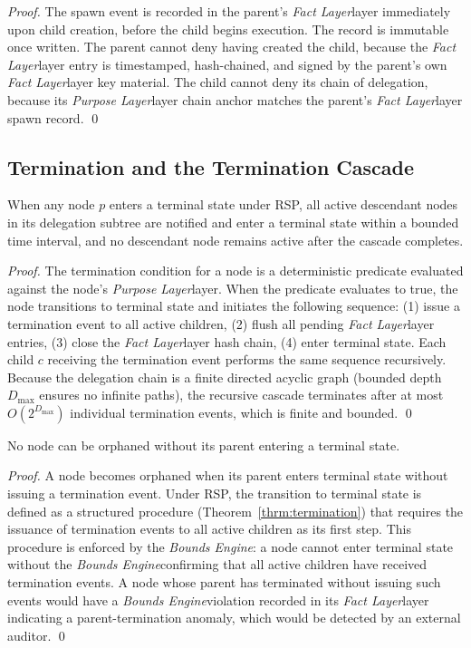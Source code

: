 \documentclass[12pt]{article}
\def\purpose{\textit{Purpose Layer}}
\def\bounds{\textit{Bounds Engine}}
\def\fact{\textit{Fact Layer}}
\begin{document}
\begin{proof}
The spawn event is recorded in the parent's \fact layer immediately upon child creation, before the child begins execution. The record is immutable once written. The parent cannot deny having created the child, because the \fact layer entry is timestamped, hash-chained, and signed by the parent's own \fact layer key material. The child cannot deny its chain of delegation, because its \purpose layer chain anchor matches the parent's \fact layer spawn record. \qed
\end{proof}

\subsection{Termination and the Termination Cascade}

\begin{thrm}[Termination]
\label{thrm:termination}
When any node $p$ enters a terminal state under RSP, all active descendant nodes in its delegation subtree are notified and enter a terminal state within a bounded time interval, and no descendant node remains active after the cascade completes.
\end{thrm}

\begin{proof}
The termination condition for a node is a deterministic predicate evaluated against the node's \purpose layer. When the predicate evaluates to true, the node transitions to terminal state and initiates the following sequence: (1) issue a termination event to all active children, (2) flush all pending \fact layer entries, (3) close the \fact layer hash chain, (4) enter terminal state. Each child $c$ receiving the termination event performs the same sequence recursively. Because the delegation chain is a finite directed acyclic graph (bounded depth $D_{\max}$ ensures no infinite paths), the recursive cascade terminates after at most $O(2^{D_{\max}})$ individual termination events, which is finite and bounded. \qed
\end{proof}

\begin{lemm}
\label{lemm:orphan-safety}
No node can be orphaned without its parent entering a terminal state.
\end{lemm}

\begin{proof}
A node becomes orphaned when its parent enters terminal state without issuing a termination event. Under RSP, the transition to terminal state is defined as a structured procedure (Theorem~\ref{thrm:termination}) that requires the issuance of termination events to all active children as its first step. This procedure is enforced by the \bounds: a node cannot enter terminal state without the \bounds confirming that all active children have received termination events. A node whose parent has terminated without issuing such events would have a \bounds violation recorded in its \fact layer indicating a parent-termination anomaly, which would be detected by an external auditor. \qed
\end{proof}
\end{document}

